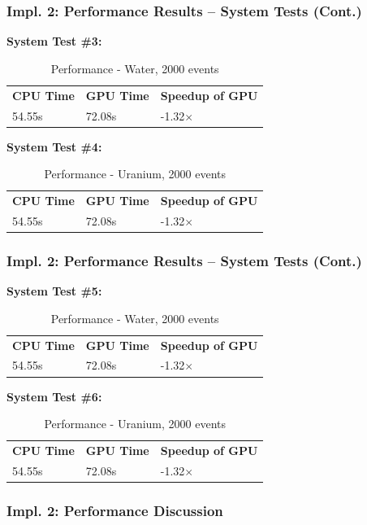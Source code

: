 \documentclass{beamer}
\begin{document}
\begin{frame}
\frametitle{Impl. 2: Performance Results -- System Tests (Cont.)}
\textbf{System Test \#3:}\\
\begin{table}
		\caption{Performance - Water, 2000 events}
		\begin{tabular}{lll}
		\bf CPU Time&\bf  GPU Time&\bf Speedup of GPU\\
		54.55s&72.08s&-1.32$\times$\\
		\end{tabular}
\end{table}
\textbf{System Test \#4:}\\
\begin{table}
		\caption{Performance - Uranium, 2000 events}
		\begin{tabular}{lll}
		\bf CPU Time&\bf  GPU Time&\bf Speedup of GPU\\
		54.55s&72.08s&-1.32$\times$\\
		\end{tabular}
\end{table}
\end{frame}

\begin{frame}
\frametitle{Impl. 2: Performance Results -- System Tests (Cont.)}
\textbf{System Test \#5:}\\
\begin{table}
		\caption{Performance - Water, 2000 events}
		\begin{tabular}{lll}
		\bf CPU Time&\bf  GPU Time&\bf Speedup of GPU\\
		54.55s&72.08s&-1.32$\times$\\
		\end{tabular}
\end{table}
\textbf{System Test \#6:}\\
\begin{table}
		\caption{Performance - Uranium, 2000 events}
		\begin{tabular}{lll}
		\bf CPU Time&\bf  GPU Time&\bf Speedup of GPU\\
		54.55s&72.08s&-1.32$\times$\\
		\end{tabular}
\end{table}
\end{frame}

\begin{frame}
\frametitle{Impl. 2: Performance Discussion}
\end{frame}
\end{document}
